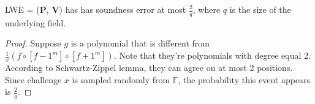 \begin{lemma}
\label{lemma:szkpctcc}

LWE = ($\textbf{P}$, $\textbf{V}$) has has soundness error at most $\frac{2}{q}$, where $q$ is the size of the underlying field.

\end{lemma}
\begin{proof}

Suppose $g$ is a polynomial that is different from $\frac{1}{x} (f \circ [f - 1^m] \circ [f + 1^m])$. Note that they're polynomials with degree equal 2. According to Schwartz-Zippel lemma, they can agree on at most 2 positions. Since challenge $x$ is sampled randomly from $\mathbb{F}$, the probability this event appears is $\frac{2}{q}$.

\end{proof}